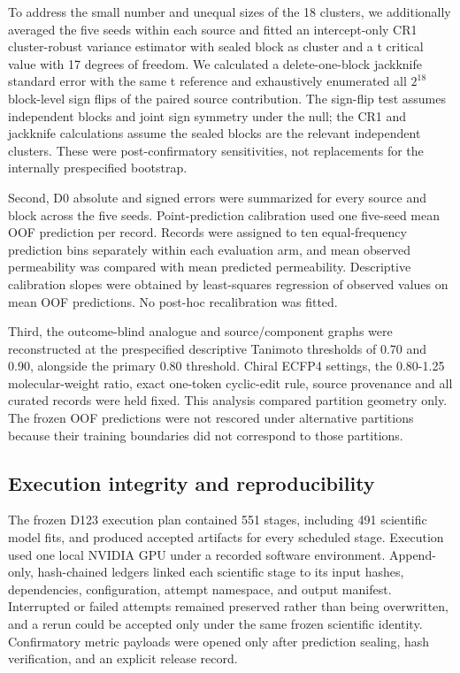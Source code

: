 \documentclass[referee,lineno,pdflatex,Numbered,sn-basic]{sn-jnl}
\begin{document}
To address the small number and unequal sizes of the 18 clusters, we additionally averaged the five seeds within each source and fitted an intercept-only CR1 cluster-robust variance estimator with sealed block as cluster and a t critical value with 17 degrees of freedom. We calculated a delete-one-block jackknife standard error with the same t reference and exhaustively enumerated all $2^{18}$ block-level sign flips of the paired source contribution. The sign-flip test assumes independent blocks and joint sign symmetry under the null; the CR1 and jackknife calculations assume the sealed blocks are the relevant independent clusters. These were post-confirmatory sensitivities, not replacements for the internally prespecified bootstrap.

Second, D0 absolute and signed errors were summarized for every source and block across the five seeds. Point-prediction calibration used one five-seed mean OOF prediction per record. Records were assigned to ten equal-frequency prediction bins separately within each evaluation arm, and mean observed permeability was compared with mean predicted permeability. Descriptive calibration slopes were obtained by least-squares regression of observed values on mean OOF predictions. No post-hoc recalibration was fitted.

Third, the outcome-blind analogue and source/component graphs were reconstructed at the prespecified descriptive Tanimoto thresholds of 0.70 and 0.90, alongside the primary 0.80 threshold. Chiral ECFP4 settings, the 0.80-1.25 molecular-weight ratio, exact one-token cyclic-edit rule, source provenance and all curated records were held fixed. This analysis compared partition geometry only. The frozen OOF predictions were not rescored under alternative partitions because their training boundaries did not correspond to those partitions.

\subsection{Execution integrity and reproducibility}

The frozen D123 execution plan contained 551 stages, including 491 scientific model fits, and produced accepted artifacts for every scheduled stage. Execution used one local NVIDIA GPU under a recorded software environment. Append-only, hash-chained ledgers linked each scientific stage to its input hashes, dependencies, configuration, attempt namespace, and output manifest. Interrupted or failed attempts remained preserved rather than being overwritten, and a rerun could be accepted only under the same frozen scientific identity. Confirmatory metric payloads were opened only after prediction sealing, hash verification, and an explicit release record.
\end{document}
